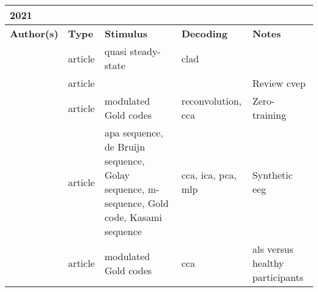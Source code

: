 \documentclass[a4paper,landscape]{article}
\begin{document}
\begin{table}[H]
	\begin{tabular}{p{5cm}p{2cm}p{5cm}p{5cm}p{6.5cm}}
		\textbf{2021} & & & & \\
		\toprule
		\textbf{Author(s)} & \textbf{Type} & \textbf{Stimulus} & \textbf{Decoding} & \textbf{Notes} \\
		\midrule
		\citeauthor{kaya2021} & article & quasi steady-state & \acrshort{clad} & \\
		\citeauthor{martinez2021} & article & & & Review \acrshort{cvep} \\
		\citeauthor{thielen2021} & article & modulated Gold codes & reconvolution, \acrshort{cca} & Zero-training \\
		\citeauthor{torres2021} & article & \acrshort{apa} sequence, de Bruijn sequence, Golay sequence, m-sequence, Gold code, Kasami sequence & \acrshort{cca}, \acrshort{ica}, \acrshort{pca}, \acrshort{mlp}  & Synthetic \acrshort{eeg} \\
		\citeauthor{verbaarschot2021} & article & modulated Gold codes & \acrshort{cca} & \acrshort{als} versus healthy participants \\
		\bottomrule
	\end{tabular}
\end{table}
\end{document}
